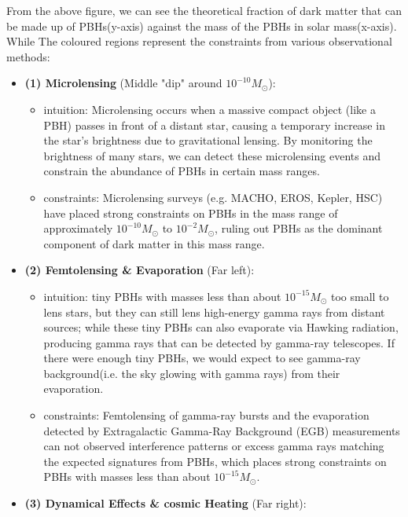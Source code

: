 \begin{extra}
    From the above figure, we can see the theoretical fraction of dark matter that can be made up of PBHs(y-axis) against the mass of the PBHs in solar mass(x-axis). While The coloured regions represent the constraints from various observational methods: \\

    \begin{itemize}
        \item \textbf{(1) Microlensing} (Middle "dip" around $10^{-10} M_\odot$):
        \begin{itemize}
            \item intuition: Microlensing occurs when a massive compact object (like a PBH) passes in front of a distant star, causing a temporary increase in the star's brightness due to gravitational lensing. By monitoring the brightness of many stars, we can detect these microlensing events and constrain the abundance of PBHs in certain mass ranges.
            \item constraints: Microlensing surveys (e.g. MACHO, EROS, Kepler, HSC) have placed strong constraints on PBHs in the mass range of approximately $10^{-10} M_\odot$ to $10^{-2} M_\odot$, ruling out PBHs as the dominant component of dark matter in this mass range.
        \end{itemize}
        \item \textbf{(2) Femtolensing \& Evaporation} (Far left):
        \begin{itemize}
            \item intuition: tiny PBHs with masses less than about $10^{-15} M_\odot$ too small to lens stars, but they can still lens high-energy gamma rays from distant sources; while these tiny PBHs can also evaporate via Hawking radiation, producing gamma rays that can be detected by gamma-ray telescopes. If there were enough tiny PBHs, we would expect to see gamma-ray background(i.e. the sky glowing with gamma rays) from their evaporation.
            \item constraints: Femtolensing of gamma-ray bursts and the evaporation detected by Extragalactic Gamma-Ray Background (EGB) measurements can not observed interference patterns or excess gamma rays matching the expected signatures from PBHs, which places strong constraints on PBHs with masses less than about $10^{-15} M_\odot$.
        \end{itemize} 
        \item \textbf{(3) Dynamical Effects \& cosmic Heating}  (Far right):

\end{itemize}
\end{extra}
